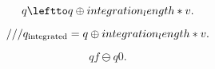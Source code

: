 \documentclass{article}
\begin{document}
\[ q \leftto q \oplus integration_length * v . \]
\pagebreak

\[ /// q_{\rm integrated} = q \oplus integration_length * v. \]
\pagebreak

\[ qf \ominus q0. \]
\pagebreak
\end{document}
